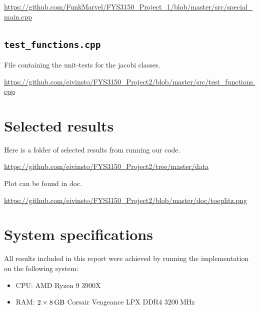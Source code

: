 \documentclass[reprint,english,notitlepage]{revtex4-1}  %
\begin{document}
\url{https://github.com/FunkMarvel/FYS3150_Project_1/blob/master/src/special_main.cpp}

\cprotect\subsection{\verb+test_functions.cpp+} \label{A.7}
File containing the unit-tests for the jacobi classes.

\url{https://github.com/eivinsto/FYS3150_Project2/blob/master/src/test_functions.cpp}

\newpage
\section{Selected results} \label{B}
Here is a folder of selected results from running our code.

\url{https://github.com/eivinsto/FYS3150_Project2/tree/master/data}

Plot can be found in doc.

\url{https://github.com/eivinsto/FYS3150_Project2/blob/master/doc/toeplitz.png}

\newpage
\section{System specifications} \label{C}
All results included in this report were achieved by running the implementation on the following system:
\begin{itemize}
	\item CPU: AMD Ryzen \(9\) \(3900\)X
	\item RAM: \(2\times\SI{8}{\giga\byte}\) Corsair Vengeance LPX DDR\(4\) \(\SI{3200}{\mega\hertz}\)
\end{itemize}
\end{document}
